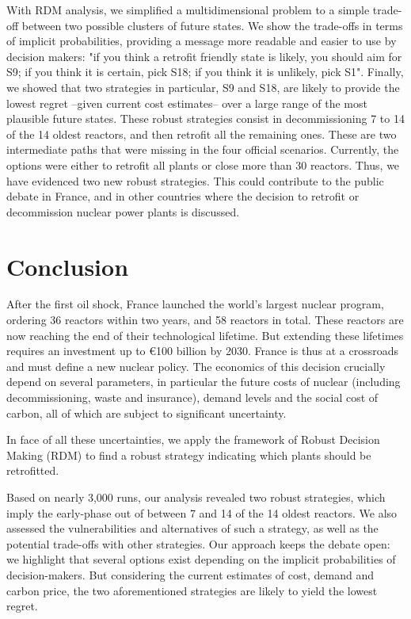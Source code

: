With RDM analysis, we simplified a multidimensional problem to a simple trade-off between two possible clusters of future states. We show the trade-offs in terms of implicit probabilities, providing a message more readable and easier to use by decision makers: "if you think a retrofit friendly state is likely, you should aim for S9; if you think it is certain, pick S18; if you think it is unlikely, pick S1". 
Finally, we showed that two strategies in particular, S9 and S18, are likely to provide the lowest regret --given current cost estimates-- over a large range of the most plausible future states. These robust strategies consist in decommissioning 7 to 14 of the 14 oldest reactors, and then retrofit all the remaining ones. These are two intermediate paths that were missing in the four official scenarios. Currently, the options were either to retrofit all plants or close more than 30 reactors. Thus, we have evidenced two new robust strategies. This could contribute to the public debate in France, and in other countries where the decision to retrofit or decommission nuclear power plants is discussed.




\section{Conclusion}
\label{sec:conclusion2}

After the first oil shock, France launched the world’s largest nuclear program, ordering 36 reactors within two years, and 58 reactors in total. These reactors are now reaching the end of their technological lifetime. But extending these lifetimes requires an investment up to \euro 100 billion by 2030. 
France is thus at a crossroads and must define a new nuclear policy. The economics of this decision crucially depend on several parameters, in particular the future costs of nuclear (including decommissioning, waste and insurance), demand levels and the social cost of carbon, all of which are subject to significant uncertainty.

In face of all these uncertainties, we apply the framework of Robust Decision Making (RDM) to find a robust strategy indicating which plants should be retrofitted.

Based on nearly 3,000 runs, our analysis revealed two robust strategies, which imply the early-phase out of between 7 and 14 of the 14 oldest reactors. We also assessed the vulnerabilities and alternatives of such a strategy, as well as the potential trade-offs with other strategies. Our approach keeps the debate open: we highlight that several options exist depending on the implicit probabilities of decision-makers. But considering the current estimates of cost, demand and carbon price, the two aforementioned strategies are likely to yield the lowest regret. 

